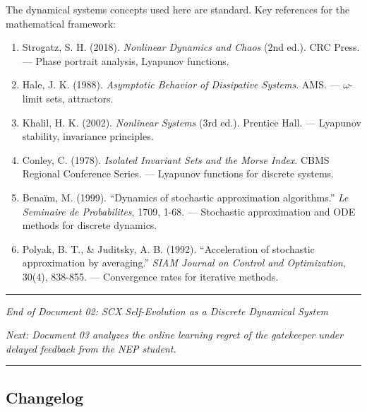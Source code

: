 \documentclass[
  12pt,
]{ctexart}
\providecommand{\tightlist}{%
  \setlength{\itemsep}{0pt}\setlength{\parskip}{0pt}}
\begin{document}
The dynamical systems concepts used here are standard. Key references
for the mathematical framework:

\begin{enumerate}
\def\labelenumi{\arabic{enumi}.}
\tightlist
\item
  Strogatz, S. H. (2018). \emph{Nonlinear Dynamics and Chaos} (2nd ed.).
  CRC Press. --- Phase portrait analysis, Lyapunov functions.
\item
  Hale, J. K. (1988). \emph{Asymptotic Behavior of Dissipative Systems}.
  AMS. --- \(\omega\)-limit sets, attractors.
\item
  Khalil, H. K. (2002). \emph{Nonlinear Systems} (3rd ed.). Prentice
  Hall. --- Lyapunov stability, invariance principles.
\item
  Conley, C. (1978). \emph{Isolated Invariant Sets and the Morse Index}.
  CBMS Regional Conference Series. --- Lyapunov functions for discrete
  systems.
\item
  Benaïm, M. (1999). ``Dynamics of stochastic approximation
  algorithms.'' \emph{Le Seminaire de Probabilites}, 1709, 1-68. ---
  Stochastic approximation and ODE methods for discrete dynamics.
\item
  Polyak, B. T., \& Juditsky, A. B. (1992). ``Acceleration of stochastic
  approximation by averaging.'' \emph{SIAM Journal on Control and
  Optimization}, 30(4), 838-855. --- Convergence rates for iterative
  methods.
\end{enumerate}

\begin{center}\rule{0.5\linewidth}{0.5pt}\end{center}

\emph{End of Document 02: SCX Self-Evolution as a Discrete Dynamical
System}

\emph{Next: Document 03 analyzes the online learning regret of the
gatekeeper under delayed feedback from the NEP student.}

\begin{center}\rule{0.5\linewidth}{0.5pt}\end{center}

\subsection{Changelog}\label{changelog}
\end{document}

